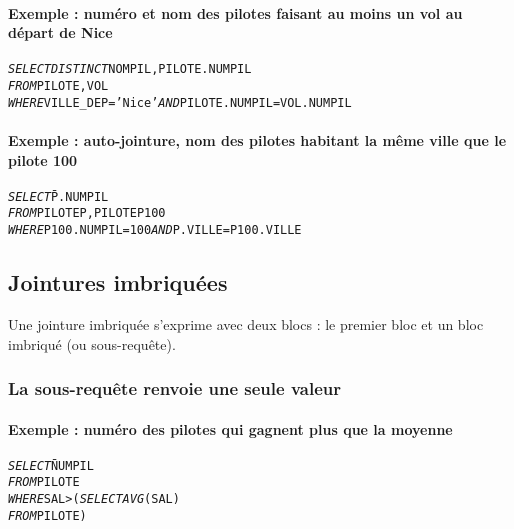 \documentclass[10pt]{article}
\begin{document}
			\paragraph{Exemple : numéro et nom des pilotes faisant au moins un vol au départ de Nice}
				\begin{alltt}
					\begin{tabbing}
						\emph{SELECT} \= \emph{DISTINCT} NOMPIL, PILOTE.NUMPIL\\
						\emph{FROM} \> PILOTE, VOL\\
						\emph{WHERE} \> VILLE_DEP='Nice' \emph{AND} PILOTE.NUMPIL=VOL.NUMPIL
					\end{tabbing}
				\end{alltt}
				
			\paragraph{Exemple : auto-jointure, nom des pilotes habitant la même ville que le pilote 100}
				\begin{alltt}
					\begin{tabbing}
						\emph{SELECT} \= P.NUMPIL\\
						\emph{FROM} \> PILOTE P, PILOTE P100\\
						\emph{WHERE} \> P100.NUMPIL=100 \emph{AND} P.VILLE=P100.VILLE
					\end{tabbing}
				\end{alltt}
				
		\subsection{Jointures imbriquées}
			Une jointure imbriquée s'exprime avec deux blocs : le premier bloc et un bloc imbriqué (ou sous-requête).
			
			\subsubsection{La sous-requête renvoie une seule valeur}
				\paragraph{Exemple : numéro des pilotes qui gagnent plus que la moyenne}
					\begin{alltt}
						\begin{tabbing}
							\emph{SELECT} \= NUMPIL\\
							\emph{FROM} \> PILOTE\\
							\emph{WHERE} \> SAL > (\= \emph{SELECT} \= \emph{AVG}(SAL) \=\\
												   \> \> \emph{FROM} \> PILOTE \>)
						\end{tabbing}
					\end{alltt}
					
\end{document}
